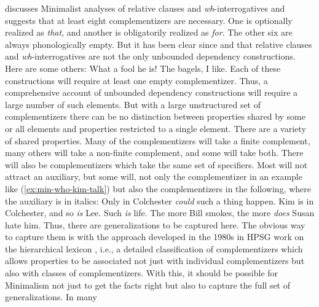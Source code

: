\documentclass[output=paper,biblatex,babelshorthands,newtxmath,draftmode,colorlinks,citecolor=brown]{langscibook}
\begin{document}
\citet{Borsley2006a,Borsley2017a} discusses Minimalist analyses of relative clauses and \emph{wh}-interrogatives and suggests that at least eight complementizers are necessary. One is optionally realized as \emph{that}, and another is obligatorily realized as \emph{for}. The other six are always phonologically empty. But it has been clear since \citet{Ross67} and \citet{Chomsky77a-u} that relative clauses and \emph{wh}-interrogatives are not the only unbounded dependency constructions. Here are some others:
\eal
\settowidth{}
\ex What a fool he is!                          
\ex The bagels, I like.	                        
\zl 
Each of these constructions will require at least one empty complementizer. Thus, a comprehensive
account of unbounded dependency constructions will require a large number of such elements. 
But with a large unstructured set of complementizers there can be no distinction between properties
shared by some or all elements and properties restricted to a single element. There are a variety of shared properties. Many of the
complementizers will take a finite complement, many others will take a non-finite complement, and
some will take both. There will also be complementizers which take the same set of specifiers. Most
will not attract an auxiliary, but some will, not only the complementizer in an example like
(\ref{ex:min-who-kim-talk}) but also the complementizers in the following, where the auxiliary is in
italics: 
\eal
\ex Only in Colchester \emph{could} such a thing happen.
\ex Kim is in Colchester, and so \emph{is} Lee.
\ex Such \emph{is} life.
\ex The more Bill smokes, the more \emph{does} Susan hate him.
\zl
Thus, there are generalizations to be captured here. The obvious way to capture them is with the
approach developed in the 1980s in HPSG work on the hierarchical lexicon \citep*{FPW85a,Flickinger87}, i.e., a detailed
classification of complementizers which allows properties to be associated not just with individual
complementizers but also with classes of complementizers. With this, it should be possible for
Minimalism not just to get the facts right but also to capture the full set of generalizations. In many
\end{document}
